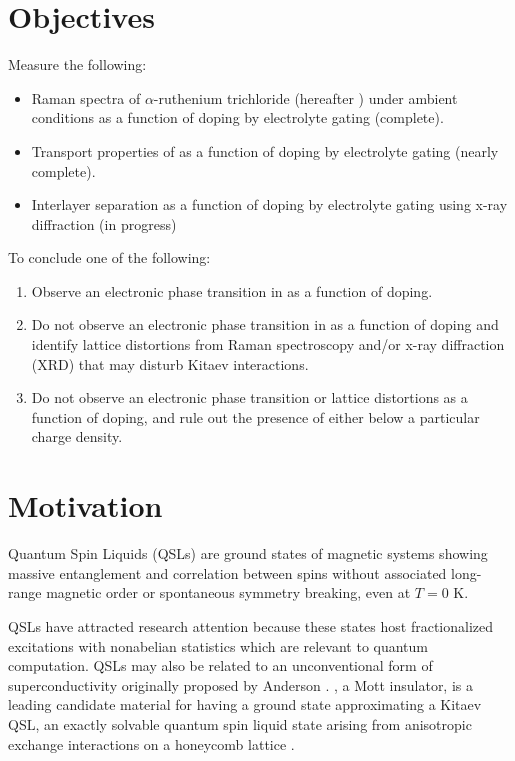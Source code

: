 \documentclass[11pt]{article}
\begin{document}
\section{Objectives}
Measure the following:
\begin{itemize}
	\item Raman spectra of $\alpha$-ruthenium trichloride (hereafter \ruclnospace) under ambient conditions as a function of doping by electrolyte gating (complete).
	\item Transport properties of \rucl as a function of doping by electrolyte gating (nearly complete).
	\item Interlayer separation as a function of doping by electrolyte gating using x-ray diffraction (in progress)
\end{itemize}
To conclude one of the following:
\begin{enumerate}
	\item Observe an electronic phase transition in \rucl as a function of doping.
	\item Do not observe an electronic phase transition in \rucl as a function of doping and identify lattice distortions from Raman spectroscopy and/or x-ray diffraction (XRD) that may disturb Kitaev interactions.
	\item Do not observe an electronic phase transition or lattice distortions as a function of doping, and rule out the presence of either below a particular charge density.
\end{enumerate}

\section{Motivation}
Quantum Spin Liquids (QSLs) are ground states of magnetic systems showing massive entanglement and correlation between spins without associated long-range magnetic order or spontaneous symmetry breaking, even at $T = 0$ K. 

QSLs have attracted research attention because these states host fractionalized excitations with nonabelian statistics \cite{Balents2010} which are relevant to quantum computation. QSLs may also be related to an unconventional form of superconductivity originally proposed by Anderson \cite{Lee2008}. \ruclnospace , a Mott insulator, is a leading candidate material for having a ground state approximating a Kitaev QSL, an exactly solvable quantum spin liquid state arising from anisotropic exchange interactions on a honeycomb lattice \cite{Kitaev2006}.
\end{document}
